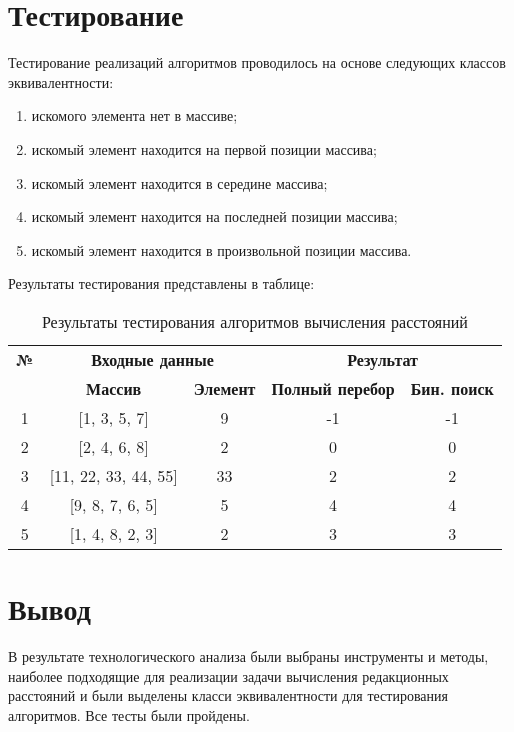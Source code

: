 \section{Тестирование}

Тестирование реализаций алгоритмов проводилось на основе следующих классов эквивалентности:

\begin{enumerate}[label=\arabic*)]
	\item {искомого элемента нет в массиве;}
	\item {искомый элемент находится на первой позиции массива;}
	\item {искомый элемент находится в середине массива;}
	\item {искомый элемент находится на последней позиции массива;}
	\item {искомый элемент находится в произвольной позиции массива.}
\end{enumerate}

Результаты тестирования представлены в таблице:

\begin{table}[h!]
	\centering
	\caption{Результаты тестирования алгоритмов вычисления расстояний}
	\label{tab:test_results}
	\begin{tabular}{|c|c|c|c|c|}
		\hline
		\textbf{№} & \multicolumn{2}{c|}{\textbf{Входные данные}} & \multicolumn{2}{c|}{\textbf{Результат}} \\ \cline{2-5}
		& \textbf{Массив} & \textbf{Элемент} & \textbf{Полный перебор} & \textbf{Бин. поиск} \\ \hline
		1 & [1, 3, 5, 7] & 9 & -1 & -1 \\ \hline
		2 & [2, 4, 6, 8] & 2 & 0 & 0 \\ \hline
		3 & [11, 22, 33, 44, 55] & 33 & 2 & 2 \\ \hline
		4 & [9, 8, 7, 6, 5] & 5 & 4 & 4 \\ \hline
		5 & [1, 4, 8, 2, 3] & 2 & 3 & 3 \\ \hline

	\end{tabular}
\end{table}



\section*{Вывод}

В результате технологического анализа были выбраны инструменты и методы, наиболее подходящие для реализации задачи вычисления редакционных расстояний и были выделены класси эквивалентности для тестирования алгоритмов. Все тесты были пройдены.

